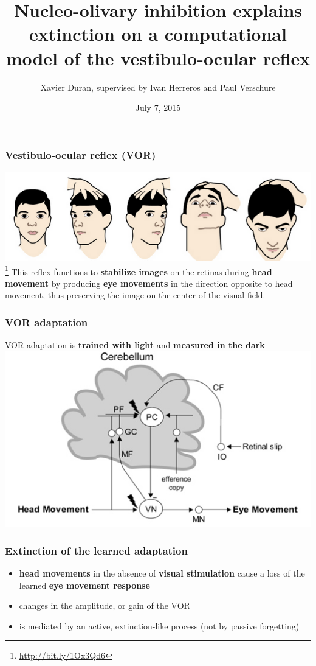 \documentclass[10pt, compress]{beamer}
\title{Nucleo-olivary inhibition explains extinction on a computational model of the vestibulo-ocular reflex}
\subtitle{}
\date{July 7, 2015}
\author{Xavier Duran, supervised by Ivan Herreros and Paul Verschure}
\institute{Master in Cognitive Systems and Interactive Media}
\begin{document}
\maketitle

\begin{frame}[fragile]
  \frametitle{Vestibulo-ocular reflex (VOR)}
  \includegraphics[scale=0.5]{images/vor.png}
  \newline
  \footnote{\url{http://bit.ly/1Ox3Qd6}}
  \newline
  This reflex functions to \textbf{stabilize images} on the retinas during \textbf{head movement} by producing \textbf{eye movements} in the direction opposite to head movement, thus preserving the image on the center of the visual field.
\end{frame}

\begin{frame}[fragile]
  \frametitle{VOR adaptation}
  VOR adaptation is \textbf{trained with light} and \textbf{measured in the dark}
  \cite{Boyden2004}
  \newline
  \newline
  \includegraphics[scale=0.4]{images/boyden.png}
\end{frame}

\begin{frame}[fragile]
  \frametitle{Extinction of the learned adaptation}
  \begin{itemize}
    \item \textbf{head movements} in the absence of \textbf{visual stimulation} cause a loss of the learned \textbf{eye movement response}
    \item changes in the amplitude, or gain of the VOR
    \item is mediated by an \alert{active, extinction-like process} (not by passive forgetting)
  \end{itemize}
  \cite{Cohen2004}
\end{frame}
\end{document}
